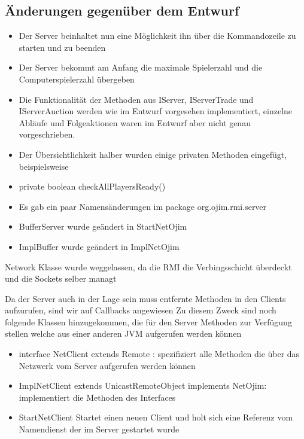 \documentclass[a4paper,10pt]{article}
\begin{document}
\subsection {Änderungen gegenüber dem Entwurf}
\begin{itemize}
\item Der Server beinhaltet nun eine Möglichkeit ihn über die Kommandozeile zu starten und zu beenden
\item Der Server bekommt am Anfang die maximale Spielerzahl und die Computerspielerzahl übergeben
\item Die Funktionalität der Methoden aus IServer, IServerTrade und IServerAuction werden wie im Entwurf vorgesehen implementiert, einzelne Abläufe und Folgeaktionen waren im Entwurf aber nicht genau vorgeschrieben.
\item Der Übersichtlichkeit halber wurden einige privaten Methoden eingefügt, beispielsweise
\end{itemize}
\begin{itemize}
\item private boolean checkAllPlayersReady()
\item Es gab ein paar Namensänderungen im package org.ojim.rmi.server 
\end{itemize}
\begin{itemize}
\item BufferServer wurde geändert in StartNetOjim
\item ImplBuffer wurde geändert in ImplNetOjim
\end{itemize}
\item Network Klasse wurde weggelassen, da die RMI die Verbingsschicht überdeckt und die Sockets selber managt
\item Da der Server auch in der Lage sein muss entfernte Methoden in den Clients aufzurufen, sind wir auf Callbacks angewiesen Zu diesem Zweck sind noch folgende Klassen hinzugekommen, die für den Server Methoden zur Verfügung stellen welche aus einer anderen JVM aufgerufen werden können
\begin{itemize}
\item interface NetClient extends Remote : spezifiziert alle Methoden die über das Netzwerk vom Server aufgerufen werden können 
\item ImplNetClient extends UnicastRemoteObject implements NetOjim: implementiert die Methoden des Interfaces
\item StartNetClient Startet einen neuen Client und holt sich eine Referenz vom Namendienst der im Server gestartet wurde
\end{itemize}
\end{document}
